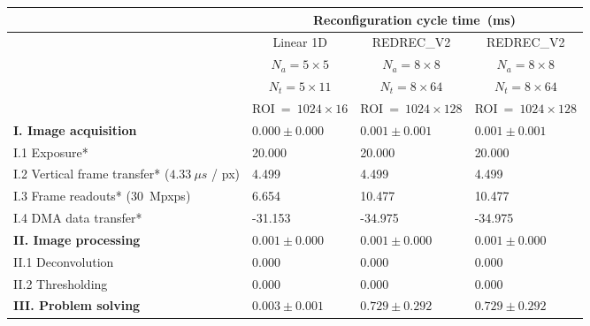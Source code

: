 \documentclass{article}
\begin{document}
\begin{table}
    \centering
        \begin{tabular}{|l|p{35mm}|p{35mm}|p{35mm}|} 
            \hline
               & \multicolumn{3}{c|}{Reconfiguration cycle time~(ms)} \\ 
            \hline
            & \multicolumn{1}{c|}{Linear 1D} & \multicolumn{1}{c|}{REDREC\_V2} & \multicolumn{1}{c|}{REDREC\_V2} \\ %
                & \multicolumn{1}{c|}{$N_a = 5 \times 5$} & \multicolumn{1}{c|}{$N_a = 8 \times 8$} & \multicolumn{1}{c|}{$N_a = 8 \times 8$} \\ 
                & \multicolumn{1}{c|}{$N_t = 5 \times 11$} & \multicolumn{1}{c|}{$N_t = 8 \times 64$} & \multicolumn{1}{c|}{$N_t = 8 \times 64$} \\ 
                & \multicolumn{1}{c|}{ROI~=~$1024\times16$} & \multicolumn{1}{c|}{ROI~=~$1024\times128$} & \multicolumn{1}{c|}{ROI~=~$1024\times128$} \\ 
            \hline
            \textbf{I. Image acquisition} & $0.000\pm0.000$ & $0.001\pm0.001$ & $0.001\pm0.001$ \\ 
            \hline
            \hspace{3mm} \small I.1 Exposure* &\small20.000 & \small20.000 & \small20.000 \\ 
            \hspace{3mm} \small I.2 Vertical frame transfer* ($4.33~\mu s$ / px) &\small4.499 &\small4.499 &\small4.499\\ 
            \hspace{3mm} \small I.3 Frame readouts* (30~Mpxps) &\small6.654&\small10.477&\small10.477\\ 
            \hspace{3mm} \small I.4 DMA data transfer* &\small-31.153 &\small-34.975 &\small-34.975\\ 
            \hline
            \textbf{II. Image processing} & $0.001\pm0.000$ & $0.001\pm0.000$ & $0.001\pm0.000$ \\ 
            \hspace{3mm} \small II.1 Deconvolution &\small0.000  &\small0.000 &\small0.000 \\ 
            \hspace{3mm} \small II.2 Thresholding  &\small0.000 &\small0.000&\small0.000\\ 
            \hline
            \textbf{III. Problem solving} & $0.003\pm0.001 $ & $0.729\pm0.292$ & $0.729\pm0.292$ \\ 

\end{tabular}
\end{table}
\end{document}

